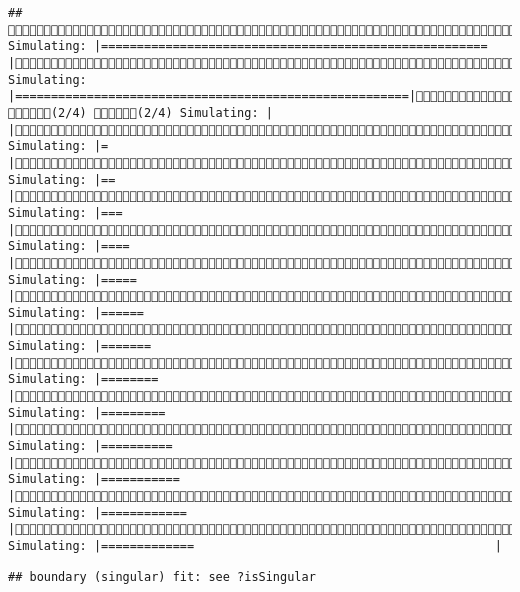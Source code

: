\documentclass[]{article}
\begin{document}
\begin{verbatim}
## (1/4) Simulating: |====================================================== |(1/4) Simulating: |=======================================================|(1/4) (2/4) (2/4) Simulating: |                                                       |(2/4) Simulating: |=                                                      |(2/4) Simulating: |==                                                     |(2/4) Simulating: |===                                                    |(2/4) Simulating: |====                                                   |(2/4) Simulating: |=====                                                  |(2/4) Simulating: |======                                                 |(2/4) Simulating: |=======                                                |(2/4) Simulating: |========                                               |(2/4) Simulating: |=========                                              |(2/4) Simulating: |==========                                             |(2/4) Simulating: |===========                                            |(2/4) Simulating: |============                                           |(2/4) Simulating: |=============                                          |
\end{verbatim}

\begin{verbatim}
## boundary (singular) fit: see ?isSingular
\end{verbatim}
\end{document}
